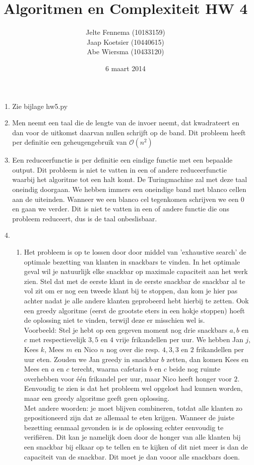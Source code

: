 \documentclass[11pt]{article}
\title{\textbf{Algoritmen en Complexiteit HW 4}}
\author{Jelte Fennema (10183159)\\
		Jaap Koetsier (10440615)\\
        Abe Wiersma (10433120)}
\date{6 maart 2014}
\newcommand{\bigO}{\ensuremath{\mathcal{O}}}
\begin{document}
\maketitle

\begin{enumerate}
    \item Zie bijlage hw5.py
    \item
    Men neemt een taal die de lengte van de invoer neemt, dat kwadrateert en dan voor de uitkomst daarvan nullen schrijft op de band. Dit probleem heeft per definitie een geheugengebruik van \bigO$(n^2)$ 
    \item Een reduceerfunctie is per definitie een eindige functie met een bepaalde output. Dit probleem is niet te vatten in een of andere reduceerfunctie waarbij het algoritme tot een halt komt. De Turingmachine zal met deze taal oneindig doorgaan. We hebben immers een oneindige band met blanco cellen aan de uiteinden. Wanneer we een blanco cel tegenkomen schrijven we een 0 en gaan we verder. Dit is niet te vatten in een of andere functie die ons probleem reduceert, dus is de taal onbeslisbaar.
    \item
        \begin{enumerate}
            \item Het probleem is op te lossen door door middel van 'exhaustive search' de optimale bezetting van klanten in snackbars te vinden. In het optimale geval wil je natuurlijk elke snackbar op maximale capaciteit aan het werk zien. Stel dat met de eerste klant in de eerste snackbar de snackbar al te vol zit om er nog een tweede klant bij te stoppen, dan kom je hier pas achter nadat je alle andere klanten geprobeerd hebt hierbij te zetten. Ook een greedy algoritme (eerst de grootste eters in een hokje stoppen) hoeft de oplossing niet te vinden, terwijl deze er misschien wel is. \\Voorbeeld: Stel je hebt op een gegeven moment nog drie snackbars $a, b$ en $c$ met respectievelijk $3, 5$ en $4$ vrije frikandellen per uur. We hebben Jan $j$, Kees $k$, Mees $m$ en Nico $n$ nog over die resp. $4, 3, 3$ en $2$ frikandellen per uur eten. Zouden we Jan greedy in snackbar $b$ zetten, dan komen Kees en Mees en $a$ en $c$ terecht, waarna cafetaria $b$ en $c$ beide nog ruimte overhebben voor één frikandel per uur, maar Nico heeft honger voor $2$. Eenvoudig te zien is dat het probleem wel opgelost had kunnen worden, maar een greedy algoritme geeft geen oplossing.\\Met andere woorden: je moet blijven combineren, totdat alle klanten zo gepositioneerd zijn dat ze allemaal te eten krijgen. Wanneer de juiste bezetting eenmaal gevonden is is de oplossing echter eenvoudig te verifi\"{e}ren. Dit kan je namelijk doen door de honger van alle klanten bij een snackbar bij elkaar op te tellen en te kijken of dit niet meer is dan de capaciteit van de snackbar. Dit moet je dan vooor alle snackbars doen. 


\end{enumerate}
\end{enumerate}
\end{document}
